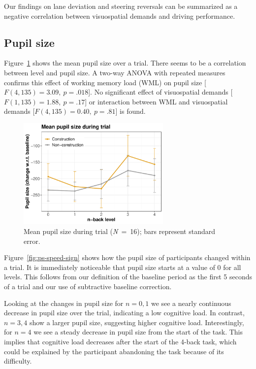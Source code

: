 Our findings on lane deviation and steering reversals can be summarized as a negative correlation between visuospatial demands and driving performance.

\subsection{Pupil size}
Figure~\ref{fig:mean-ps} shows the mean pupil size over a trial. 
There seems to be a correlation between \nback level and pupil size.
A two-way ANOVA with repeated measures confirms this effect of working memory load (WML) on pupil size [\(F(4,135)=3.09,\ p=.018\)].
No significant effect of visuospatial demands [\(F(1,135)=1.88,\ p=.17\)] or interaction between WML and visuospatial demands [\(F(4,135)=0.40,\ p=.81\)] is found.

\begin{figure}
  \centering
  \includegraphics[width=7.5cm]{images/pupil_size_interaction.pdf}
  \caption{Mean pupil size during trial (\textit{N}\ =\ 16); bars represent standard error.}
  \label{fig:mean-ps}
\end{figure}

Figure~\ref{fig:ps-speed-sign} shows how the pupil size of participants changed within a trial.
It is immediately noticeable that pupil size starts at a value of 0 for all \nback levels.
This follows from our definition of the baseline period as the first 5 seconds of a trial and our use of subtractive baseline correction.

Looking at the changes in pupil size for \(n = 0,1\) we see a nearly continuous decrease in pupil size over the trial, indicating a low cognitive load.
In contrast, \(n=3,4\) show a larger pupil size, suggesting higher cognitive load.
Interestingly, for \(n=4\) we see a steady decrease in pupil size from the start of the \nback task. 
This implies that cognitive load decreases after the start of the 4-back task, which could be explained by the participant abandoning the task because of its difficulty. 

